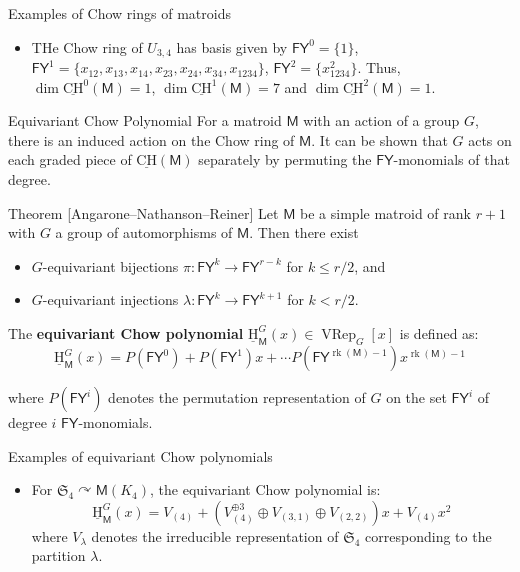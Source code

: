 \documentclass[final]{beamer}
\newlength{\twocolwid}
\DeclareMathOperator{\rk}{rk}
\newcommand{\M}{\mathsf{M}}
\newcommand{\FY}{\mathsf{FY}}
\newcommand{\uH}{\underline{\mathrm{H}}}
\newcommand{\uCH}{\underline{\mathrm{CH}}}
\newcommand{\VRep}{\operatorname{VRep}}
\begin{document}
\begin{frame}[t]
\begin{columns}[t]
\begin{column}{\twocolwid}
\begin{block}{Examples of Chow rings of matroids}
\begin{itemize}
        \item THe Chow ring of $U_{3,4}$ has basis given by
        \(\FY^0 = \{1\}\), \(\FY^1 = \{x_{12},
        x_{13},x_{14},x_{23},x_{24},x_{34},x_{1234}\}\), \(\FY^2 = \{x^2_{1234}\}.\)
        Thus, $\dim \uCH^0(\M) = 1$, $\dim \uCH^1(\M) = 7$ and $\dim \uCH^2(\M) = 1$.
    \end{itemize}

\end{block}

\vspace*{-5mm}
\begin{block}{Equivariant Chow Polynomial}
For a matroid $\M$ with an action of a group $G$, there is an
induced action on the Chow ring of $\M$. It can be shown that
$G$ acts on each graded piece of $\uCH(\M)$ separately by permuting
the $\FY$-monomials of that degree.

\begin{alertblock}{Theorem [Angarone--Nathanson--Reiner\cite{angarone2024chowringsmatroidspermutation}}]
    Let $\M$ be a simple matroid of rank $r+1$ with $G$ a group of automorphisms of $\M$. Then there exist
    \begin{itemize}
        \item $G$-equivariant bijections $\pi: \FY^k\to \FY^{r-k}$ for $k\leq r/2$, and
        \item $G$-equivariant injections $\lambda: \FY^k\to \FY^{k+1}$ for $k<r/2$.
    \end{itemize}
    \end{alertblock}

The
\textbf{equivariant Chow polynomial}
$\uH^G_\M(x)\in\VRep_G[x]$ is defined as:
\[\uH_\M^G(x) = P(\FY^0)+P(\FY^1)x+\cdots P(\FY^{\rk(\M)-1})x^{\rk(\M)-1}\]

where $P(\FY^i)$ denotes the permutation representation of $G$ on the
set $\FY^i$ of degree $i$ $\FY$-monomials.

\end{block}
\begin{block}{Examples of equivariant Chow polynomials}
    \begin{itemize}
        \item For $\mathfrak{S}_4 \curvearrowright \M(K_4)$, the equivariant Chow polynomial is:
        \[\uH_\M^G(x) = V_{(4)}+(V_{(4)}^{\oplus 3}\oplus V_{(3,1)}\oplus V_{(2,2)})x + V_{(4)}x^2\]
        where $V_\lambda$ denotes the irreducible representation of $\mathfrak{S}_4$ corresponding to the
        partition $\lambda$.


\end{itemize}
\end{block}
\end{column}
\end{columns}
\end{frame}
\end{document}
